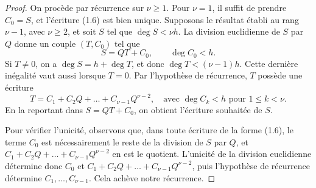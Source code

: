 \documentclass[]{report}
\begin{document}
\begin{proof}
    On procède par récurrence sur $\nu \ge 1$. Pour $\nu = 1$, il suffit de prendre $C_0 = S$, et l'écriture (1.6) est bien unique. Supposons le résultat établi au rang $\nu - 1$, avec $\nu \ge 2$, et soit $S$ tel que $\deg S < \nu h$. La division euclidienne de $S$ par $Q$ donne un couple $(T, C_0)$ tel que
    \[S = QT + C_0, \qquad \deg C_0 < h.\]
    Si $T \neq 0$, on a $\deg S = h + \deg T$, et donc $\deg T < (\nu - 1)h$. Cette dernière inégalité vaut aussi lorsque $T = 0$. Par l'hypothèse de récurrence, $T$ possède une écriture
    \[T = C_1 + C_2 Q + \dots + C_{\nu - 1} Q^{\nu - 2}, \quad \text{avec } \deg C_k < h \text{ pour } 1 \le k < \nu.\]
    En la reportant dans $S = QT + C_0$, on obtient l'écriture souhaitée de $S$.

    Pour vérifier l'unicité, observons que, dans toute écriture de la forme (1.6), le terme $C_0$ est nécessairement le reste de la division de $S$ par $Q$, et $C_1 + C_2 Q + \dots + C_{\nu - 1} Q^{\nu - 2}$ en est le quotient. L'unicité de la division euclidienne détermine donc $C_0$ et $C_1 + C_2 Q + \dots + C_{\nu - 1} Q^{\nu - 2}$, puis l'hypothèse de récurrence détermine $C_1, \dots, C_{\nu - 1}$. Cela achève notre récurrence.
\end{proof}
\end{document}
